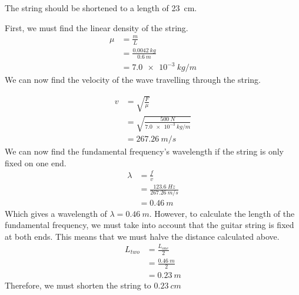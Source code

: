 \begin{finalanswer}
	The string should be shortened to a length of \SI{23}{cm}.
\end{finalanswer}
\begin{solution}
	First, we must find the linear density of the string.
	\begin{align*}
	\mu&= \frac{m}{L}\\
	&= \frac{\SI{0.0042}{kg}}{\SI{0.6}{m}}\\
	&= \SI{7.0e-3}{kg/m}
	\end{align*}
	We can now find the velocity of the wave travelling through the string.
	
\begin{align*}
v& = \sqrt{\frac{F}{\mu}}\\
& = \sqrt{\frac{\SI{500}{N}}{\SI{7.0e-3}{kg/m}}}\\
& = \SI{267.26}{m/s}
\end{align*}
We can now find the fundamental frequency's wavelength if the string is only fixed on one end.
\begin{align*}
\lambda &= \frac{f}{v}\\
&=\frac{\SI{123.6}{Hz}}{\SI{267.26}{m/s}}\\
&= \SI{0.46}{m}
\end{align*}
Which gives a wavelength of $\lambda = \SI{0.46}{m}$. However, to calculate the length of the fundamental frequency, we must take into account that the guitar string is fixed at both ends. This means that we must halve the distance calculated above.
\begin{align*}
L_{two}&= \frac{L_{one}}{2}\\
&=\frac{\SI{0.46}{m}}{2}\\
&=\SI{0.23}{m}
\end{align*}
Therefore, we must shorten the string to $\SI{0.23}{cm}$
\end{solution}




 


